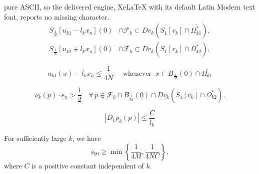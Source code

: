 \documentclass[10pt,a4paper]{amsart}
\begin{document}
pure ASCII, so the delivered engine, XeLaTeX with its default Latin Modern text font, reports no missing character.
  \begin{align}
    S_{\frac{1}{N}}[u_{k1}-l_kx_n](0) &\cap \mathcal{F}_k \subset Dv_k(S_1[v_k] \cap \overline{\Omega^*_{k1}}), \label{vust} \\
    S_{\frac{1}{N}}[u_{k2}+l_kx_n](0) &\cap \mathcal{F}_k \subset Dv_k(S_1[v_k] \cap \overline{\Omega^*_{k2}}), \label{vust2}
  \end{align}

\begin{equation}\label{vust4}
  u_{k1}(x) - l_kx_n \leq \frac{1}{4N}\quad\text{ whenever }\ x \in B_{\frac{1}{M}}(0) \cap \overline{\Omega_{k1}}
\end{equation}

\begin{equation}\label{nukp1}
\nu_k(p) \cdot e_n > \frac{1}{2} \quad \forall\, p \in \mathcal{F}_k \cap B_{\frac{1}{M}}(0) \cap Dv_k(\overline{S_1[v_k] \cap \Omega^*_{k2}}).
\end{equation}

\begin{equation}\label{7yue}
  \left| D_1\rho_k(p) \right| \leq \frac{C}{l_k}
\end{equation}

\begin{lemma}\label{ests}
For sufficiently large \( k \), we have
\begin{equation}\label{dudu}
s_{k0} \geq \min\left\{\frac{1}{4M}, \frac{1}{4NC}\right\},
\end{equation}
where \( C \) is a positive constant independent of \( k \).
\end{lemma}
\end{document}
